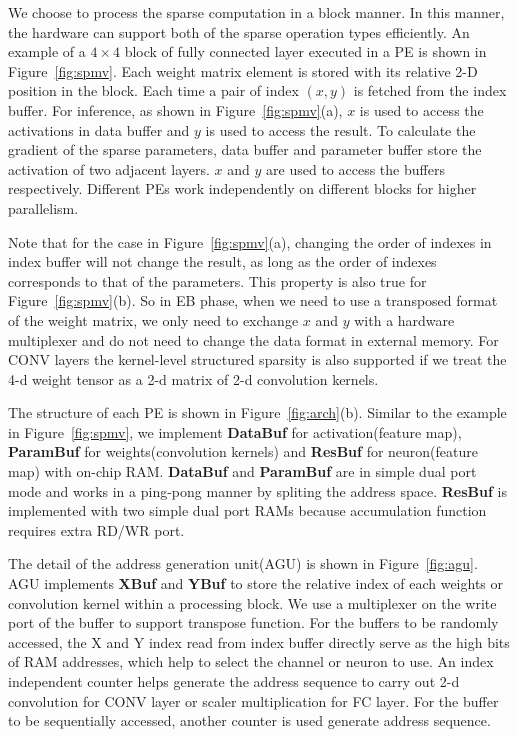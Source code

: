 We choose to process the sparse computation in a block manner. In this manner, the hardware can support both of the sparse operation types efficiently. An example of a $4\times 4$ block of fully connected layer executed in a PE is shown in Figure~\ref{fig:spmv}. Each weight matrix element is stored with its relative 2-D position in the block. Each time a pair of index $(x, y)$ is fetched from the index buffer. For inference, as shown in Figure~\ref{fig:spmv}(a), $x$ is used to access the activations in data buffer and $y$ is used to access the result. To calculate the gradient of the sparse parameters, data buffer and parameter buffer store the activation of two adjacent layers. $x$ and $y$ are used to access the buffers respectively. Different PEs work independently on different blocks for higher parallelism.

Note that for the case in Figure~\ref{fig:spmv}(a), changing the order of indexes in index buffer will not change the result, as long as the order of indexes corresponds to that of the parameters. This property is also true for Figure~\ref{fig:spmv}(b). So in EB phase, when we need to use a transposed format of the weight matrix, we only need to exchange $x$ and $y$ with a hardware multiplexer and do not need to change the data format in external memory. For CONV layers the kernel-level structured sparsity is also supported if we treat the 4-d weight tensor as a 2-d matrix of 2-d convolution kernels.

The structure of each PE is shown in Figure~\ref{fig:arch}(b). Similar to the example in Figure~\ref{fig:spmv}, we implement {\bf{DataBuf}} for activation(feature map), {\bf{ParamBuf}} for weights(convolution kernels) and {\bf{ResBuf}} for neuron(feature map) with on-chip RAM. {\bf{DataBuf}} and {\bf{ParamBuf}} are in simple dual port mode and works in a ping-pong manner by spliting the address space. {\bf{ResBuf}} is implemented with two simple dual port RAMs because accumulation function requires extra RD/WR port.

The detail of the address generation unit(AGU) is shown in Figure~\ref{fig:agu}. AGU implements {\bf{XBuf}} and {\bf{YBuf}} to store the relative index of each weights or convolution kernel within a processing block. We use a multiplexer on the write port of the buffer to support transpose function. For the buffers to be randomly accessed, the X and Y index read from index buffer directly serve as the high bits of RAM addresses, which help to select the channel or neuron to use. An index independent counter helps generate the address sequence to carry out 2-d convolution for CONV layer or scaler multiplication for FC layer. For the buffer to be sequentially accessed, another counter is used generate address sequence.

